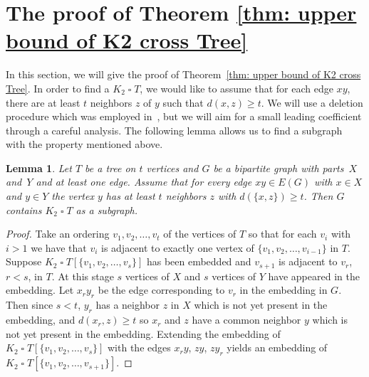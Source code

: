 \documentclass[11pt,a4paper]{article}
\newtheorem{lemma}{Lemma}[section]
\theoremstyle{definition}
\DeclareMathOperator{\ex}{ex}
\begin{document}
    \section{The proof of Theorem \ref{thm: upper bound of K2 cross Tree}}\label{sec: tree}

        In this section, we will give the proof of Theorem~\ref{thm: upper bound of K2 cross Tree}.
        In order to find a $K_2 \mathbin{\square} T$, we would like to assume that for each edge $xy$, there are at least $t$ neighbors $z$ of $y$ such that $d(x, z) \geq t$. We will use a deletion procedure which was employed in~\cite{bradavc2023turan}, but we will aim for a small leading coefficient through a careful analysis. 
        The following lemma allows us to find a subgraph with the property mentioned above. 

\begin{lemma} \label{embedlemma}
Let $T$ be a tree on $t$ vertices and $G$ be a bipartite graph with parts~$X$ and~$Y$ and at least one edge. Assume that for every edge $xy \in E(G)$ with $x\in X$ and $y\in Y$ the vertex $y$ has at least $t$ neighbors $z$ with $d(\{x,z\}) \ge t$. Then $G$ contains $K_2 \mathbin{\square} T$ as a subgraph.
\end{lemma}

\begin{proof}
Take an ordering $v_1,v_2,\dots,v_t$ of the vertices of $T$ so that for each $v_i$ with $i>1$ we have that $v_i$ is adjacent to exactly one vertex of $\{v_1,v_2,\dots,v_{i-1}\}$ in $T$.  Suppose $K_2 \mathbin{\square} T[\{v_1,v_2,\dots,v_s\}]$ has been embedded and $v_{s+1}$ is adjacent to $v_r$, $r<s$, in $T$. At this stage $s$ vertices of $X$ and $s$ vertices of $Y$ have appeared in the embedding. Let $x_r y_r$ be the edge corresponding to $v_r$ in the embedding in $G$.  Then since $s<t$, $y_r$ has a neighbor $z$ in $X$ which is not yet present in the embedding, and $d(x_r,z)\ge t$ so $x_r$ and $z$ have a common neighbor $y$ which is not yet present in the embedding.  Extending the embedding of $K_2 \mathbin{\square} T[\{v_1,v_2,\dots,v_s\}]$ with the edges $x_r y$, $zy$, $z y_r$ yields an embedding of  $K_2 \mathbin{\square} T[\{v_1,v_2,\dots,v_{s+1}\}]$.
\end{proof}
\end{document}
